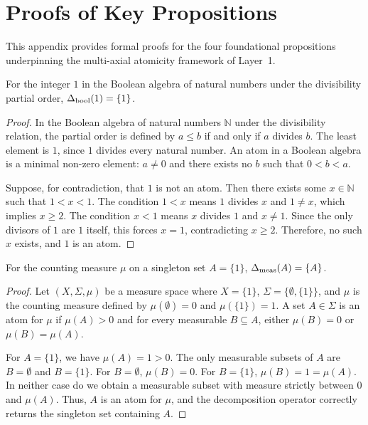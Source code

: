 \section{Proofs of Key Propositions}
\label{app:proofs}

This appendix provides formal proofs for the four foundational propositions underpinning the multi-axial atomicity framework of Layer~1.

\begin{proposition}\label{prop:bool-atom}
For the integer $1$ in the Boolean algebra of natural numbers under the divisibility partial order, $\Delta_{\text{bool}}(1) = \{1\}$.
\end{proposition}

\begin{proof}
In the Boolean algebra of natural numbers $\mathbb{N}$ under the divisibility relation, the partial order is defined by $a \le b$ if and only if $a$ divides $b$. The least element is $1$, since $1$ divides every natural number. An atom in a Boolean algebra is a minimal non-zero element: $a \neq 0$ and there exists no $b$ such that $0 < b < a$.

Suppose, for contradiction, that $1$ is not an atom. Then there exists some $x \in \mathbb{N}$ such that $1 < x < 1$. The condition $1 < x$ means $1$ divides $x$ and $1 \neq x$, which implies $x \ge 2$. The condition $x < 1$ means $x$ divides $1$ and $x \neq 1$. Since the only divisors of $1$ are $1$ itself, this forces $x = 1$, contradicting $x \ge 2$. Therefore, no such $x$ exists, and $1$ is an atom.
\end{proof}

\begin{proposition}\label{prop:meas-atom}
For the counting measure $\mu$ on a singleton set $A = \{1\}$, $\Delta_{\text{meas}}(A) = \{A\}$.
\end{proposition}

\begin{proof}
Let $(X, \Sigma, \mu)$ be a measure space where $X = \{1\}$, $\Sigma = \{\emptyset, \{1\}\}$, and $\mu$ is the counting measure defined by $\mu(\emptyset) = 0$ and $\mu(\{1\}) = 1$. A set $A \in \Sigma$ is an atom for $\mu$ if $\mu(A) > 0$ and for every measurable $B \subseteq A$, either $\mu(B) = 0$ or $\mu(B) = \mu(A)$.

For $A = \{1\}$, we have $\mu(A) = 1 > 0$. The only measurable subsets of $A$ are $B = \emptyset$ and $B = \{1\}$. For $B = \emptyset$, $\mu(B) = 0$. For $B = \{1\}$, $\mu(B) = 1 = \mu(A)$. In neither case do we obtain a measurable subset with measure strictly between $0$ and $\mu(A)$. Thus, $A$ is an atom for $\mu$, and the decomposition operator correctly returns the singleton set containing $A$.
\end{proof}

